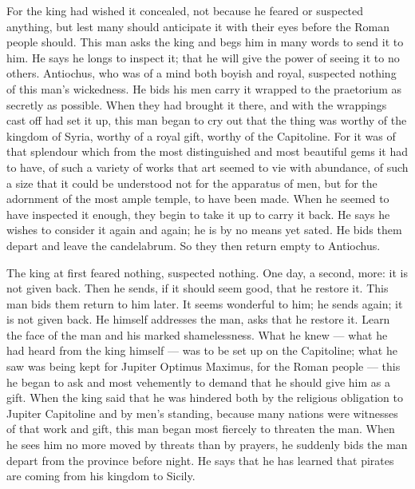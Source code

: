  For the king had wished it concealed, not because he feared or suspected anything, but lest many should anticipate it with their eyes before the Roman people should. This man asks the king and begs him in many words to send it to him. He says he longs to inspect it; that he will give the power of seeing it to no others. Antiochus, who was of a mind both boyish and royal, suspected nothing of this man's wickedness. He bids his men carry it wrapped to the praetorium as secretly as possible. When they had brought it there, and with the wrappings cast off had set it up, this man began to cry out that the thing was worthy of the kingdom of Syria, worthy of a royal gift, worthy of the Capitoline. For it was of that splendour which from the most distinguished and most beautiful gems it had to have, of such a variety of works that art seemed to vie with abundance, of such a size that it could be understood not for the apparatus of men, but for the adornment of the most ample temple, to have been made. When he seemed to have inspected it enough, they begin to take it up to carry it back. He says he wishes to consider it again and again; he is by no means yet sated. He bids them depart and leave the candelabrum. So they then return empty to Antiochus.

 The king at first feared nothing, suspected nothing. One day, a second, more: it is not given back. Then he sends, if it should seem good, that he restore it. This man bids them return to him later. It seems wonderful to him; he sends again; it is not given back. He himself addresses the man, asks that he restore it. Learn the face of the man and his marked shamelessness. What he knew --- what he had heard from the king himself --- was to be set up on the Capitoline; what he saw was being kept for Jupiter Optimus Maximus, for the Roman people --- this he began to ask and most vehemently to demand that he should give him as a gift. When the king said that he was hindered both by the religious obligation to Jupiter Capitoline and by men's standing, because many nations were witnesses of that work and gift, this man began most fiercely to threaten the man. When he sees him no more moved by threats than by prayers, he suddenly bids the man depart from the province before night. He says that he has learned that pirates are coming from his kingdom to Sicily.

